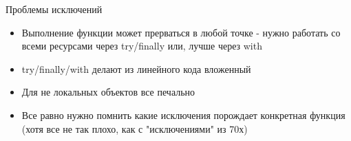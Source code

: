 \documentclass{article}
\begin{document}
\begin{center} Проблемы исключений \end{center}
\begin{itemize}
	\item Выполнение функции может прерваться в любой точке - нужно работать со всеми ресурсами
	      через try/finally или, лучше через with
	\item try/finally/with делают из линейного кода вложенный
	\item Для не локальных объектов все печально
	\item Все равно нужно помнить какие исключения порождает конкретная функция
	      (хотя все не так плохо, как с "исключениями" из 70х)
\end{itemize}
\newpage

\end{document}
